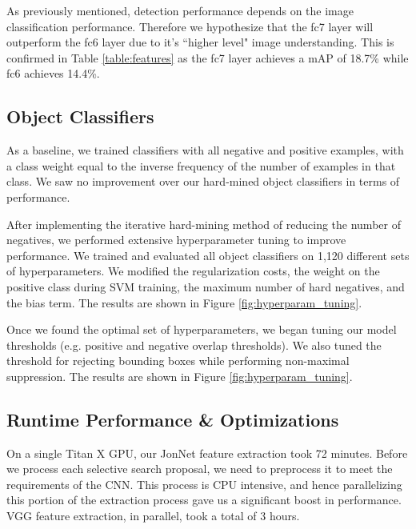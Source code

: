 \documentclass[10pt,twocolumn,letterpaper]{article}
\begin{document}
As previously mentioned, detection performance depends on the image classification performance. Therefore we hypothesize that the fc7 layer will outperform the fc6 layer due to it's ``higher level" image understanding. This is confirmed in Table \ref{table:features} as the fc7 layer achieves a mAP of 18.7\% while fc6 achieves 14.4\%.

\subsection{Object Classifiers}
As a baseline, we trained classifiers with all negative and positive examples, with a class weight equal to the inverse frequency of the number of examples in that class. We saw no improvement over our hard-mined object classifiers in terms of performance.

After implementing the iterative hard-mining method of reducing the number of negatives, we performed extensive hyperparameter tuning to improve performance. We trained and evaluated all object classifiers on 1,120 different sets of hyperparameters. We modified the regularization costs, the weight on the positive class during SVM training, the maximum number of hard negatives, and the bias term. The results are shown in Figure \ref{fig:hyperparam_tuning}. 

Once we found the optimal set of hyperparameters, we began tuning our model thresholds (e.g. positive and negative overlap thresholds). We also tuned the threshold for rejecting bounding boxes while performing non-maximal suppression. The results are shown in Figure \ref{fig:hyperparam_tuning}.


\subsection{Runtime Performance \& Optimizations}

On a single Titan X GPU, our JonNet feature extraction took 72 minutes. Before we process each selective search proposal, we need to preprocess it to meet the requirements of the CNN. This process is CPU intensive, and hence parallelizing this portion of the extraction process gave us a significant boost in performance. VGG feature extraction, in parallel, took a total of 3 hours.
\end{document}
